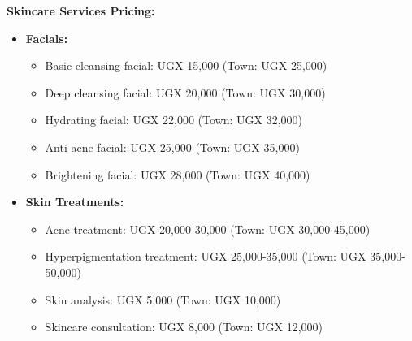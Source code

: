 \textbf{Skincare Services Pricing:}
\begin{itemize}[leftmargin=2em]
    \item \textbf{Facials:}
    \begin{itemize}
        \item Basic cleansing facial: UGX 15,000 (Town: UGX 25,000)
        \item Deep cleansing facial: UGX 20,000 (Town: UGX 30,000)
        \item Hydrating facial: UGX 22,000 (Town: UGX 32,000)
        \item Anti-acne facial: UGX 25,000 (Town: UGX 35,000)
        \item Brightening facial: UGX 28,000 (Town: UGX 40,000)
    \end{itemize}
    
    \item \textbf{Skin Treatments:}
    \begin{itemize}
        \item Acne treatment: UGX 20,000-30,000 (Town: UGX 30,000-45,000)
        \item Hyperpigmentation treatment: UGX 25,000-35,000 (Town: UGX 35,000-50,000)
        \item Skin analysis: UGX 5,000 (Town: UGX 10,000)
        \item Skincare consultation: UGX 8,000 (Town: UGX 12,000)
    \end{itemize}
\end{itemize}

